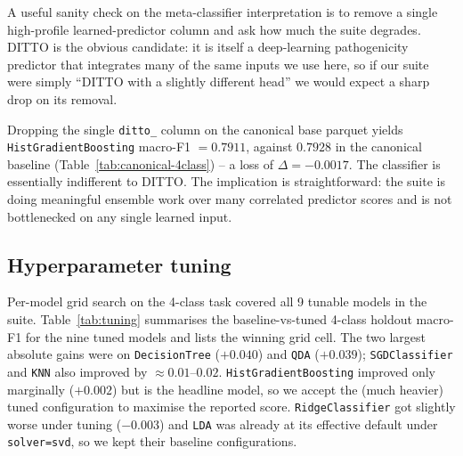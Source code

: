 \documentclass[11pt,a4paper]{article}
\begin{document}
A useful sanity check on the meta-classifier interpretation is to remove a
single high-profile learned-predictor column and ask how much the suite
degrades. DITTO is the obvious candidate: it is itself a deep-learning
pathogenicity predictor that integrates many of the same inputs we use here,
so if our suite were simply ``DITTO with a slightly different head'' we
would expect a sharp drop on its removal.

Dropping the single \texttt{ditto\_} column on the canonical base parquet
yields \texttt{HistGradientBoosting} macro-F1 $= 0.7911$, against
$0.7928$ in the canonical baseline (Table~\ref{tab:canonical-4class}) -- a
loss of $\Delta = -0.0017$. The classifier is essentially indifferent to
DITTO. The implication is straightforward: the suite is doing meaningful
ensemble work over many correlated predictor scores and is not bottlenecked
on any single learned input.

\subsection{Hyperparameter tuning}
\label{sec:tuning-results}

Per-model grid search on the 4-class task
covered all 9 tunable models in the suite. Table~\ref{tab:tuning}
summarises the baseline-vs-tuned 4-class holdout macro-F1 for the nine
tuned models and lists the winning grid cell. The two largest absolute
gains were on \texttt{DecisionTree} ($+0.040$) and \texttt{QDA} ($+0.039$);
\texttt{SGDClassifier} and \texttt{KNN} also improved by $\approx 0.01$--$0.02$.
\texttt{HistGradientBoosting} improved only marginally ($+0.002$) but is the
headline model, so we accept the (much heavier) tuned configuration to
maximise the reported score. \texttt{RidgeClassifier} got slightly worse
under tuning ($-0.003$) and \texttt{LDA} was already at its effective default
under \texttt{solver=svd}, so we kept their baseline configurations.
\end{document}
